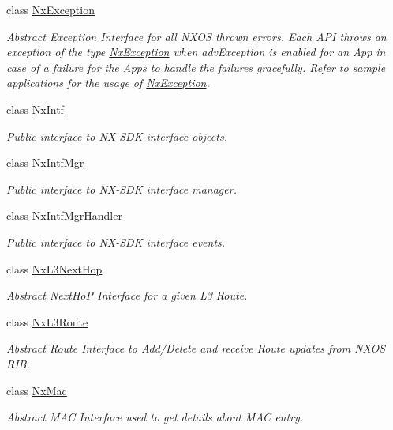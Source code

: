 \begin{DoxyCompactItemize}
class \mbox{\hyperlink{classnxos_1_1_nx_exception}{Nx\+Exception}}
\begin{DoxyCompactList}\small\item\em Abstract Exception Interface for all N\+X\+OS thrown errors. Each A\+PI throws an exception of the type \mbox{\hyperlink{classnxos_1_1_nx_exception}{Nx\+Exception}} when adv\+Exception is enabled for an App in case of a failure for the Apps to handle the failures gracefully. Refer to sample applications for the usage of \mbox{\hyperlink{classnxos_1_1_nx_exception}{Nx\+Exception}}. \end{DoxyCompactList}\item 
class \mbox{\hyperlink{classnxos_1_1_nx_intf}{Nx\+Intf}}
\begin{DoxyCompactList}\small\item\em Public interface to N\+X-\/\+S\+DK interface objects. \end{DoxyCompactList}\item 
class \mbox{\hyperlink{classnxos_1_1_nx_intf_mgr}{Nx\+Intf\+Mgr}}
\begin{DoxyCompactList}\small\item\em Public interface to N\+X-\/\+S\+DK interface manager. \end{DoxyCompactList}\item 
class \mbox{\hyperlink{classnxos_1_1_nx_intf_mgr_handler}{Nx\+Intf\+Mgr\+Handler}}
\begin{DoxyCompactList}\small\item\em Public interface to N\+X-\/\+S\+DK interface events. \end{DoxyCompactList}\item 
class \mbox{\hyperlink{classnxos_1_1_nx_l3_next_hop}{Nx\+L3\+Next\+Hop}}
\begin{DoxyCompactList}\small\item\em Abstract Next\+HoP Interface for a given L3 Route. \end{DoxyCompactList}\item 
class \mbox{\hyperlink{classnxos_1_1_nx_l3_route}{Nx\+L3\+Route}}
\begin{DoxyCompactList}\small\item\em Abstract Route Interface to Add/\+Delete and receive Route updates from N\+X\+OS R\+IB. \end{DoxyCompactList}\item 
class \mbox{\hyperlink{classnxos_1_1_nx_mac}{Nx\+Mac}}
\begin{DoxyCompactList}\small\item\em Abstract M\+AC Interface used to get details about M\+AC entry. \end{DoxyCompactList}\item 

\end{DoxyCompactItemize}
